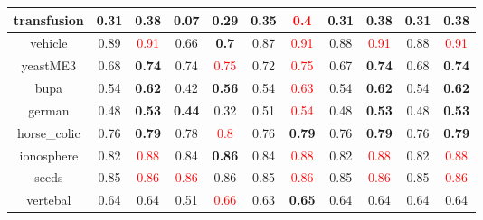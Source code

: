 \documentclass{article}%
\begin{document}
\begin{tabular}{c|cccccccccc}
\hline%
transfusion&0.31&\textbf{0.38}&0.07&\textbf{0.29}&0.35&\textcolor{red}{ 
0.4
}&0.31&\textbf{0.38}&0.31&\textbf{0.38}\\%
\hline%
vehicle&0.89&\textcolor{red}{ 
0.91
}&0.66&\textbf{0.7}&0.87&\textcolor{red}{ 
0.91
}&0.88&\textcolor{red}{ 
0.91
}&0.88&\textcolor{red}{ 
0.91
}\\%
\hline%
yeastME3&0.68&\textbf{0.74}&0.74&\textcolor{red}{ 
0.75
}&0.72&\textcolor{red}{ 
0.75
}&0.67&\textbf{0.74}&0.68&\textbf{0.74}\\%
\hline%
bupa&0.54&\textbf{0.62}&0.42&\textbf{0.56}&0.54&\textcolor{red}{ 
0.63
}&0.54&\textbf{0.62}&0.54&\textbf{0.62}\\%
\hline%
german&0.48&\textbf{0.53}&\textbf{0.44}&0.32&0.51&\textcolor{red}{ 
0.54
}&0.48&\textbf{0.53}&0.48&\textbf{0.53}\\%
\hline%
horse\_colic&0.76&\textbf{0.79}&0.78&\textcolor{red}{ 
0.8
}&0.76&\textbf{0.79}&0.76&\textbf{0.79}&0.76&\textbf{0.79}\\%
\hline%
ionosphere&0.82&\textcolor{red}{ 
0.88
}&0.84&\textbf{0.86}&0.84&\textcolor{red}{ 
0.88
}&0.82&\textcolor{red}{ 
0.88
}&0.82&\textcolor{red}{ 
0.88
}\\%
\hline%
seeds&0.85&\textcolor{red}{ 
0.86
}&\textcolor{red}{ 
0.86
}&0.86&0.85&\textcolor{red}{ 
0.86
}&0.85&\textcolor{red}{ 
0.86
}&0.85&\textcolor{red}{ 
0.86
}\\%
\hline%
vertebal&0.64&0.64&0.51&\textcolor{red}{ 
0.66
}&0.63&\textbf{0.65}&0.64&0.64&0.64&0.64\\%
\hline%
\end{tabular}

%
\end{document}
